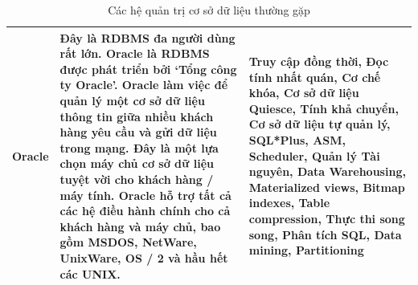 \begin{table}[h]
\centering
\begin{tabular}{|l|l|l|} 
\hline
 \multicolumn{1}{|p{2cm}|}{Oracle} & \multicolumn{1}{p{7cm}|}{Đây là RDBMS đa người dùng rất lớn. Oracle là RDBMS được phát triển bởi ‘Tổng công ty Oracle’. Oracle làm việc để quản lý một cơ sở dữ liệu thông tin giữa nhiều khách hàng yêu cầu và gửi dữ liệu trong mạng. Đây là một lựa chọn máy chủ cơ sở dữ liệu tuyệt vời cho khách hàng / máy tính. Oracle hỗ trợ tất cả các hệ điều hành chính cho cả khách hàng và máy chủ, bao gồm MSDOS, NetWare, UnixWare, OS / 2 và hầu hết các UNIX.} & \multicolumn{1}{p{6cm}|}{Truy cập đồng thời, Đọc tính nhất quán, Cơ chế khóa, Cơ sở dữ liệu Quiesce, Tính khả chuyển, Cơ sở dữ liệu tự quản lý, SQL*Plus, ASM, Scheduler, Quản lý Tài nguyên, Data Warehousing, Materialized views, Bitmap indexes, Table compression, Thực thi song song, Phân tích SQL, Data mining, Partitioning}\\
 
 \hline
\end{tabular}
\caption{Các hệ quản trị cơ sở dữ liệu thường gặp}
 \label{tab:dbms}
\end{table}

\newpage
